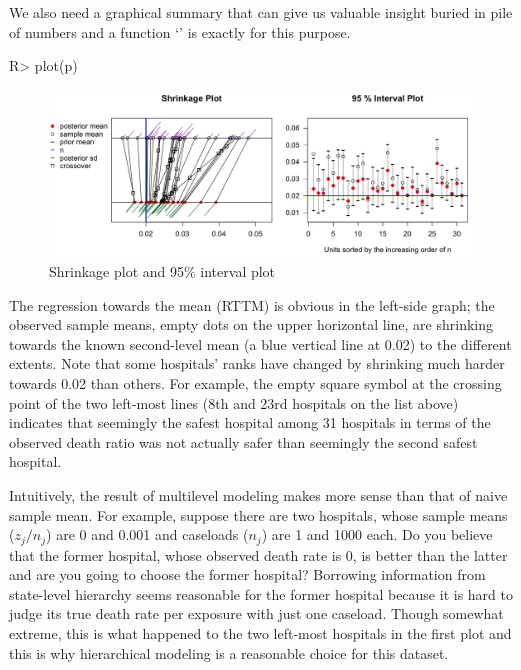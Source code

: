 \documentclass[article]{jss}
\begin{document}
We also need a graphical summary that can give us valuable insight buried in pile of numbers and a function `' is exactly for this purpose.
\begin{CodeChunk}
\begin{CodeInput}
R> plot(p)
\end{CodeInput}
\end{CodeChunk}
\begin{figure}[h]
\begin{center}
\includegraphics[scale=0.25]{hospital1.png}
\caption{Shrinkage plot and 95\% interval plot}
\end{center}
\end{figure}

The regression towards the mean (RTTM) is obvious in the left-side graph; the observed sample means, empty dots on the upper horizontal line, are shrinking towards the known second-level mean (a blue vertical line at 0.02) to the different extents. Note that some hospitals' ranks have changed by shrinking much harder towards 0.02 than others. For example, the empty square symbol at the crossing point of the two left-most lines (8th and 23rd hospitals on the list above) indicates that seemingly the safest hospital among 31 hospitals in terms of the observed death ratio was not actually safer than seemingly the second safest hospital. 


Intuitively, the result of multilevel modeling makes more sense than that of naive sample mean. For example, suppose there are two hospitals, whose sample means ($z_{j} / n_{j}$) are 0 and 0.001 and caseloads ($n_{j}$) are 1 and 1000 each. Do you believe that the former hospital, whose observed death rate is 0, is better than the latter and are you going to choose the former hospital? Borrowing information from state-level hierarchy seems reasonable for the former hospital because it is hard to judge its true death rate per exposure with just one caseload. Though somewhat extreme, this is what happened to the two left-most hospitals in the first plot and this is why hierarchical modeling is a reasonable choice for this dataset.
\end{document}
